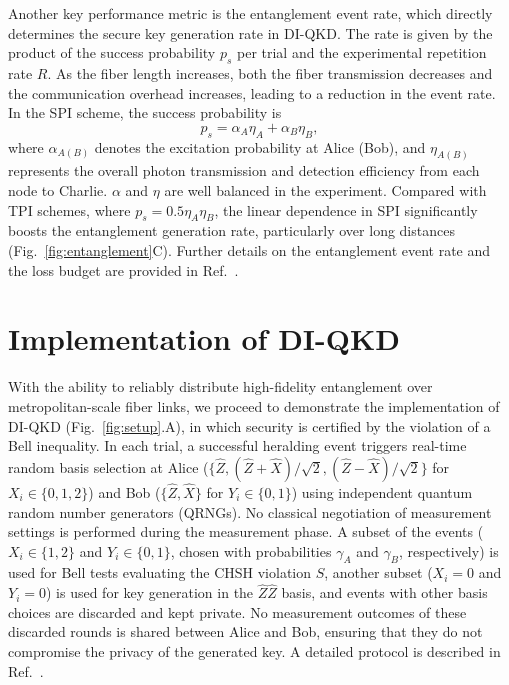 \documentclass[aps,reprint,showpacs,superscriptaddress]{revtex4-2}
\begin{document}
Another key performance metric is the entanglement event rate, which directly determines the secure key generation rate in DI-QKD. The rate is given by the product of the success probability $p_s$ per trial and the experimental repetition rate $R$. As the fiber length increases, both the fiber transmission decreases and the communication overhead increases, leading to a reduction in the event rate. In the SPI scheme, the success probability is
\begin{equation}
	p_s = \alpha_A\eta_A+\alpha_B\eta_B,
	\label{eq:success_prob}
\end{equation}
where $\alpha_{A(B)}$ denotes the excitation probability at Alice (Bob), and $\eta_{A(B)}$ represents the overall photon transmission and detection efficiency from each node to Charlie. $\alpha$ and $\eta$ are well balanced in the experiment. Compared with TPI schemes, where $p_s = 0.5\eta_A \eta_B$, the linear dependence in SPI significantly boosts the entanglement generation rate, particularly over long distances (Fig.~\ref{fig:entanglement}C). Further details on the entanglement event rate and the loss budget are provided in Ref.~\cite{SM}.

\section*{Implementation of DI-QKD}

With the ability to reliably distribute high-fidelity entanglement over metropolitan-scale fiber links, we proceed to demonstrate the implementation of DI-QKD (Fig.~\ref{fig:setup}.A), in which security is certified by the violation of a Bell inequality. In each trial, a successful heralding event triggers real-time random basis selection at Alice ($\{\hat{Z},(\hat{Z}+\hat{X})/\sqrt{2},(\hat{Z}-\hat{X})/\sqrt{2}\}$ for $X_i\in\{0,1,2\}$) and Bob ($\{\hat{Z},\hat{X}\}$ for $Y_i\in\{0,1\}$) using independent quantum random number generators (QRNGs). No classical negotiation of measurement settings is performed during the measurement phase. A subset of the events ($X_i \in \{1,2\}$ and $Y_i \in \{0,1\}$, chosen with probabilities $\gamma_A$ and $\gamma_B$, respectively) is used for Bell tests evaluating the CHSH violation $S$, another subset ($X_i = 0$ and $Y_i = 0$) is used for key generation in the $\hat{Z}\hat{Z}$ basis, and events with other basis choices are discarded and kept private. No measurement outcomes of these discarded rounds is shared between Alice and Bob, ensuring that they do not compromise the privacy of the generated key. A detailed protocol is described in Ref.~\cite{SM}.
\end{document}
